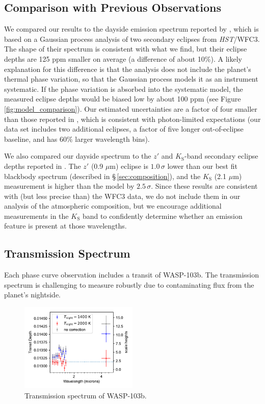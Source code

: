\documentclass[twocolumn]{aastex61}
\newcommand{\project}[1]{\textsl{#1}}
\newcommand{\HST}{\project{HST}}
\begin{document}
\subsection{Comparison with Previous Observations}
We compared our results to the dayside emission spectrum reported by \cite{cartier17}, which is based on a Gaussian process analysis of two secondary eclipses from \HST/WFC3. The shape of their spectrum is consistent with what we find, but their eclipse depths are 125 ppm smaller on average (a difference of about 10\%). A likely explanation for this difference is that the \cite{cartier17} analysis does not include the planet's thermal phase variation, so that the Gaussian process models it as an instrument systematic.  If the phase variation is absorbed into the systematic model, the measured eclipse depths would be biased low by about 100 ppm (see Figure\,\ref{fig:model_comparison}).  Our estimated uncertainties are a factor of four smaller than those reported in \cite{cartier17}, which is consistent with photon-limited expectations (our data set includes two additional eclipses, a factor of five longer out-of-eclipse baseline, and has 60\% larger wavelength bins).


We also compared our dayside spectrum to the $z'$ and $K_\mathrm{S}$-band secondary eclipse depths reported in \cite{delrez18}. The $z'$ (0.9 $\mu$m) eclipse is $1.0\,\sigma$ lower than our best fit blackbody spectrum (described in \S\,\ref{sec:composition}), and the $K_\mathrm{S}$ (2.1 $\mu$m) measurement is higher than the model by $2.5\,\sigma$. Since these results are consistent with (but less precise than) the WFC3 data, we do not include them in our analysis of the atmospheric composition, but we encourage additional measurements in the $K_\mathrm{S}$ band to confidently determine whether an emission feature is present at those wavelengths.

\subsection{Transmission Spectrum}
Each phase curve observation includes a transit of WASP-103b. The transmission spectrum is challenging to measure robustly due to contaminating flux from the planet's nightside. 
\begin{figure}
\includegraphics[width = 0.5\textwidth]{Figures/w103b_transmission_spectrum.pdf}
\caption{Transmission spectrum of WASP-103b.}
\label{fig:tspec}
\end{figure}
\end{document}
